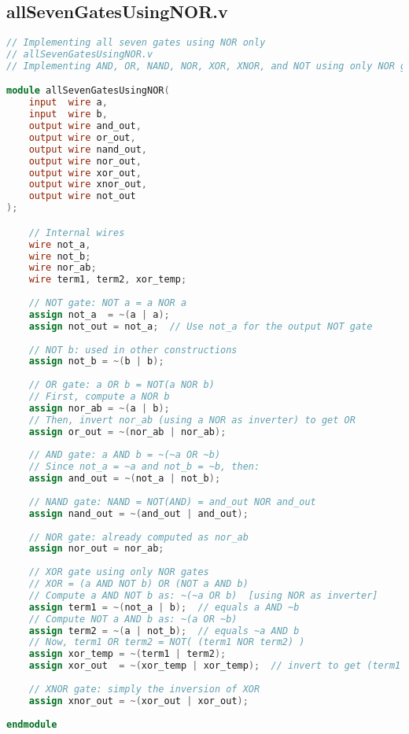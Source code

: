 \documentclass[a4paper,12pt]{article}
\begin{document}
\subsection*{allSevenGatesUsingNOR.v}
\begin{lstlisting}[language=Verilog, caption=allSevenGatesUsingNOR.v]
// Implementing all seven gates using NOR only
// allSevenGatesUsingNOR.v
// Implementing AND, OR, NAND, NOR, XOR, XNOR, and NOT using only NOR gates

module allSevenGatesUsingNOR(
    input  wire a,
    input  wire b,
    output wire and_out,
    output wire or_out,
    output wire nand_out,
    output wire nor_out,
    output wire xor_out,
    output wire xnor_out,
    output wire not_out
);

    // Internal wires
    wire not_a,
    wire not_b;
    wire nor_ab;
    wire term1, term2, xor_temp;
    
    // NOT gate: NOT a = a NOR a
    assign not_a  = ~(a | a);
    assign not_out = not_a;  // Use not_a for the output NOT gate
    
    // NOT b: used in other constructions
    assign not_b = ~(b | b);
    
    // OR gate: a OR b = NOT(a NOR b)
    // First, compute a NOR b
    assign nor_ab = ~(a | b);
    // Then, invert nor_ab (using a NOR as inverter) to get OR
    assign or_out = ~(nor_ab | nor_ab);
    
    // AND gate: a AND b = ~(~a OR ~b)
    // Since not_a = ~a and not_b = ~b, then:
    assign and_out = ~(not_a | not_b);
    
    // NAND gate: NAND = NOT(AND) = and_out NOR and_out
    assign nand_out = ~(and_out | and_out);
    
    // NOR gate: already computed as nor_ab
    assign nor_out = nor_ab;
    
    // XOR gate using only NOR gates
    // XOR = (a AND NOT b) OR (NOT a AND b)
    // Compute a AND NOT b as: ~(~a OR b)  [using NOR as inverter]
    assign term1 = ~(not_a | b);  // equals a AND ~b
    // Compute NOT a AND b as: ~(a OR ~b)
    assign term2 = ~(a | not_b);  // equals ~a AND b
    // Now, term1 OR term2 = NOT( (term1 NOR term2) )
    assign xor_temp = ~(term1 | term2);  
    assign xor_out  = ~(xor_temp | xor_temp);  // invert to get (term1 OR term2)
    
    // XNOR gate: simply the inversion of XOR
    assign xnor_out = ~(xor_out | xor_out);
    
endmodule

\end{lstlisting}
\end{document}
